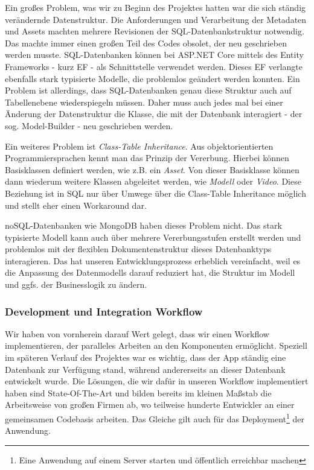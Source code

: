 \documentclass[titlepage, a4paper, 11pt]{scrartcl}
\begin{document}
          Ein großes Problem, was wir zu Beginn des Projektes hatten war die sich ständig verändernde Datenstruktur. Die Anforderungen und Verarbeitung der Metadaten und 
          Assets machten mehrere Revisionen der SQL-Datenbankstruktur notwendig. Das machte immer einen großen Teil des Codes obsolet, der neu geschrieben werden musste.
          SQL-Datenbanken können bei ASP.NET Core mittels des Entity Frameworks - kurz EF - als Schnittstelle verwendet werden. Dieses EF verlangte ebenfalls stark typisierte Modelle, 
          die problemlos geändert werden konnten. Ein Problem ist allerdings, dass SQL-Datenbanken genau diese Struktur auch auf Tabellenebene wiederspiegeln müssen.
          Daher muss auch jedes mal bei einer Änderung der Datenstruktur die Klasse, die mit der Datenbank interagiert - der sog. Model-Builder - neu geschrieben werden.
          
          Ein weiteres Problem ist \textit{Class-Table Inheritance}. Aus objektorientierten Programmiersprachen kennt man das Prinzip der Vererbung. 
          Hierbei können Basisklassen definiert werden, wie z.B. ein \textit{Asset}. Von dieser Basisklasse können dann wiederum weitere Klassen abgeleitet werden, 
          wie \textit{Modell} oder \textit{Video}. Diese Beziehung ist in SQL nur über Umwege über die Class-Table Inheritance möglich und stellt eher einen Workaround dar.

          noSQL-Datenbanken wie MongoDB haben dieses Problem nicht. Das stark typisierte Modell kann auch über mehrere Vererbungsstufen erstellt werden und problemlos
          mit der flexiblen Dokumentenstruktur dieses Datenbanktyps interagieren. Das hat unseren Entwicklungsprozess erheblich vereinfacht, weil es die Anpassung 
          des Datenmodells darauf reduziert hat, die Struktur im Modell und ggfs. der Businesslogik zu ändern.

      \subsubsection{Development und Integration Workflow}

        Wir haben von vornherein darauf Wert gelegt, dass wir einen Workflow implementieren, der paralleles Arbeiten an den Komponenten ermöglicht.
        Speziell im späteren Verlauf des Projektes war es wichtig, dass der App ständig eine Datenbank zur Verfügung stand, während andererseits an dieser Datenbank entwickelt wurde.
        Die Lösungen, die wir dafür in unseren Workflow implementiert haben sind State-Of-The-Art und bilden bereits im kleinen Maßstab die Arbeitsweise von großen Firmen
        ab, wo teilweise hunderte Entwickler an einer gemeinsamen Codebasis arbeiten. Das Gleiche gilt auch für das Deployment\footnote{Eine Anwendung auf einem Server starten und öffentlich erreichbar machen} 
        der Anwendung.
\end{document}
